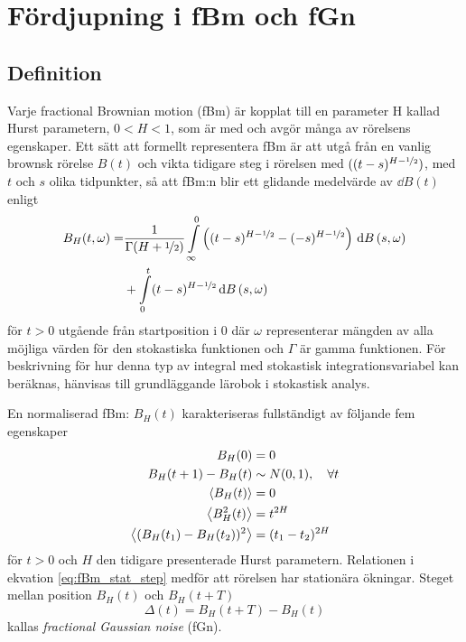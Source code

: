 \chapter{Fördjupning i fBm och fGn}
\label{sec:App_fBm}


\section{Definition}

Varje fractional Brownian motion (fBm) är kopplat till en parameter H kallad Hurst parametern, $0<H<1$, som är med och avgör många av rörelsens egenskaper. Ett sätt att formellt representera fBm är att utgå från en vanlig brownsk rörelse $B(t)$ och vikta tidigare steg i rörelsen med $((t-s)^{H-\nicefrac{1}{2}})$, med $t$ och $s$ olika tidpunkter, så att fBm:n blir ett glidande medelvärde av $\dd{B}(t)$ enligt \cite{Mandelbrot_fBm1968}
\begin{equation} \label{eq:fBm_repr}
\begin{aligned}
    B_H(t,\omega)=& \frac{1}{\Gamma(H+\nicefrac{1}{2})}
    \int_{\infty}^0 \left( (t-s)^{H-\nicefrac{1}{2}}-(-s)^{H-\nicefrac{1}{2}}\right)\,\dd{B}(s,\omega) \\
    &+ \int_0^t (t-s)^{H-\nicefrac{1}{2}} \dd{B}(s,\omega)
\end{aligned}
\end{equation}
för $t>0$ utgående från startposition i 0 där $\omega$ representerar mängden av alla möjliga värden för den stokastiska funktionen och $\Gamma$ är gamma funktionen. För beskrivning för hur denna typ av integral med stokastisk integrationsvariabel kan beräknas, hänvisas till grundläggande lärobok i stokastisk analys.

En normaliserad fBm: $B_H(t)$ karakteriseras fullständigt \cite{Dieker_fBm} av följande fem egenskaper
\begin{subequations}
\begin{align} 
    B_H(0)&=0 \\ 
    B_H(t+1)-B_H(t) &\sim N(0,1)\qcomma \forall t \label{eq:fBm_normstep}\\
    \ev{B_H(t)}&=0 \label{eq:fBm_mean} \\
    \ev{B^2_H(t)}&=t^{2H} \label{eq:fBm_var}\\
    \ev{(B_H(t_1)-B_H(t_2))^2}&=(t_1-t_2)^{2H}  \label{eq:fBm_stat_step}
\end{align}
\end{subequations}
för $t>0$ och $H$ den tidigare presenterade Hurst parametern.  Relationen i ekvation \eqref{eq:fBm_stat_step} medför att rörelsen har stationära ökningar. Steget mellan position $B_H(t)$ och $B_H(t+T)$
\begin{equation} \label{eq:fracGauss}
    \Delta(t) = B_H(t+T) - B_H(t)
\end{equation}
kallas \emph{fractional Gaussian noise} (fGn).

